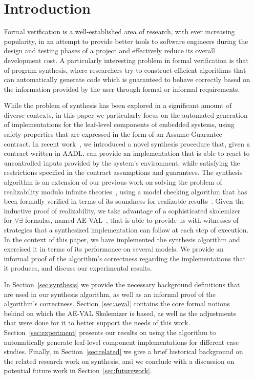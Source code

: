 \section{Introduction}
Formal verification is a well-established area of research, with ever increasing
popularity, in an attempt to provide better tools to software engineers during
the design and testing phases of a project and effectively reduce its overall
development cost. A particularly interesting problem in formal verification is
that of program synthesis, where researchers try to construct efficient algorithms that can
automatically generate code which is guaranteed to behave correctly based on the
information provided by the user through formal or informal requirements.

While the problem of synthesis has been explored in a significant amount of
diverse contexts, in this paper we particularly focus on the automated
generation of implementations for the leaf-level components of embedded
systems, using safety properties that are expressed in the form of an
Assume-Guarantee contract.
In recent work~\cite{katis2016towards}, we introduced a novel synthesis
procedure that, given a contract written in AADL, can provide an implementation
that is able to react to uncontrolled inputs provided by the system's
environment, while satisfying the restrictions specified in the contract
assumptions and guarantees. The synthesis algorithm
is an extension of our previous work on solving the problem of
realizability modulo infinite theories~\cite{Katis15:Realizability}, using a
model checking algorithm that has been formally verified in terms of its soundness for realizable
results~\cite{katis2015machine}. Given the inductive proof of realizability, we
take advantage of a sophisticated skolemizer for $\forall\exists$ formulas,
named AE-VAL~\cite{fedyukovich2015automated}, that is able to provide us with
witnesses of strategies that a synthesized implementation can follow at each
step of execution. In the context of this paper, we have implemented the synthesis 
algorithm and exercised it in terms of its performance on several models. We
provide an informal proof of the algorithm's correctness regarding the
implementations that it produces, and discuss our experimental results.

In Section~\ref{sec:synthesis} we provide the necessary background
definitions that are used in our synthesis algorithm, as well as an informal
proof of the algorithm's correctness. Section~\ref{sec:aeval} contains the
core formal notions behind on which the AE-VAL Skolemizer is based, as well
as the adjustments that were done for it to better support the needs of this
work. Section~\ref{sec:experiment} presents our results on using the algorithm
to automatically generate leaf-level component implementations for different case studies.
Finally, in Section~\ref{sec:related} we give a brief historical background on the related research work on synthesis, and we conclude with a discussion on potential future work in Section~\ref{sec:futurework}.
